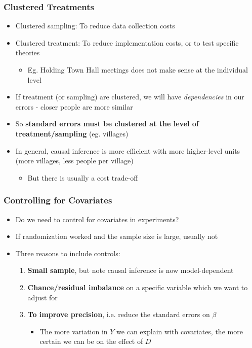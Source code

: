 \documentclass[xcolor=x11names,compress]{beamer}\usepackage[]{graphicx}\usepackage[]{color}
\renewcommand{\(}{\begin{columns}}
\renewcommand{\)}{\end{columns}}
\newcommand{\<}[1]{\begin{column}{#1}}
\renewcommand{\>}{\end{column}}
\begin{document}
\begin{frame}
\frametitle{Clustered Treatments}
\begin{itemize}
\item Clustered sampling: To reduce data collection costs
\pause
\item Clustered treatment: To reduce implementation costs, or to test specific theories
\pause
\begin{itemize}
\item Eg. Holding Town Hall meetings does not make sense at the individual level
\end{itemize}
\pause
\item If treatment (or sampling) are clustered, we will have \textit{dependencies} in our errors - closer people are more similar
\pause
\item So \textbf{standard errors must be clustered at the level of treatment/sampling} (eg. villages)
\pause
\item In general, causal inference is more efficient with more higher-level units (more villages, less people per village)
\pause
\begin{itemize}
\item But there is usually a cost trade-off
\end{itemize}
\end{itemize}
\end{frame}

\begin{frame}
\frametitle{Controlling for Covariates}
\begin{itemize}
\item Do we need to control for covariates in experiments?
\pause
\item If randomization worked and the sample size is large, usually not
\pause
\item Three reasons to include controls:
\begin{enumerate}
\item \textbf{Small sample}, but note causal inference is now model-dependent
\pause
\item \textbf{Chance/residual imbalance} on a specific variable which we want to adjust for
\pause
\item \textbf{To improve precision}, i.e. reduce the standard errors on $\beta$
\begin{itemize}
\item The more variation in $Y$ we can explain with covariates, the more certain we can be on the effect of $D$
\end{itemize}
\end{enumerate}
\end{itemize}
\end{frame}
\end{document}
